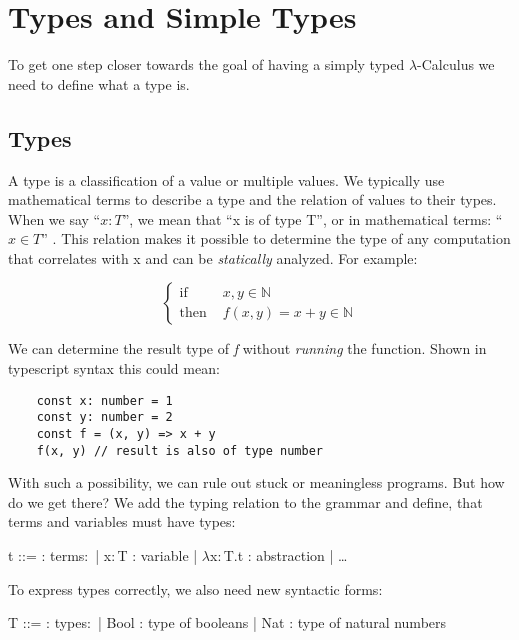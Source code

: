\section{Types and Simple Types}

To get one step closer towards the goal of having a
simply typed $\lambda$-Calculus we need to define
what a type is.

\subsection{Types}

A type is a classification of a value or multiple values.
We typically use mathematical terms to describe a type and the relation
of values to their types. When we say ``$x : T$'', we mean that
``x is of type T'', or in mathematical terms: ``$x \in T$'' \cite{pierce2002ProgLang}.
This relation makes it possible to determine the type of any computation
that correlates with x and can be \textit{statically} analyzed.
For example:

\begin{equation*}
    \begin{cases}
        \text{if }   & x,y \in \mathbb{N}            \\
        \text{then } & f(x,y) = x + y \in \mathbb{N}
    \end{cases}
\end{equation*}

We can determine the result type of \textit{f} without
\textit{running} the function. Shown in typescript syntax this could mean:

\begin{verbatim}
    const x: number = 1
    const y: number = 2
    const f = (x, y) => x + y
    f(x, y) // result is also of type number
\end{verbatim}

With such a possibility, we can rule out stuck or meaningless programs.
But how do we get there? We add the typing relation to
the grammar and define, that terms and variables must have types:

\begin{bnfgrammar}
    t ::= : terms$\colon$
    | x$\colon$T : variable
    | $\lambda$x$\colon$T.t : abstraction
    | \dots
\end{bnfgrammar}

To express types correctly, we also need new syntactic forms:

\begin{bnfgrammar}
    T ::= : types$\colon$
    | Bool : type of booleans
    | Nat : type of natural numbers
\end{bnfgrammar}

